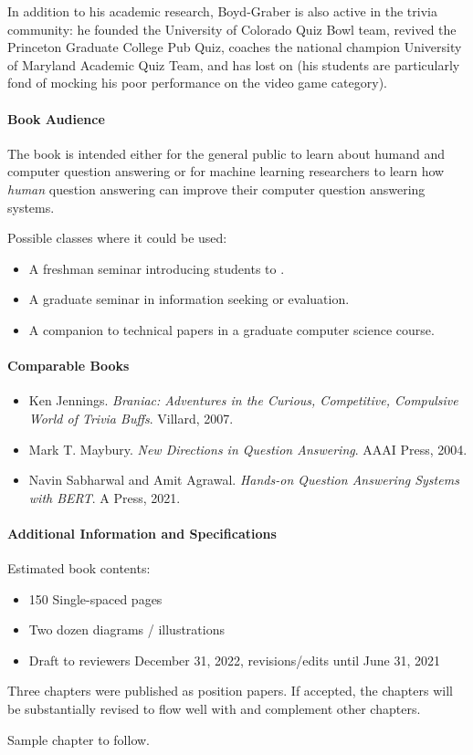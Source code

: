 In addition to his academic research, Boyd-Graber is also active in the trivia
community: he founded the University of Colorado Quiz Bowl team, revived the
Princeton Graduate College Pub Quiz, coaches the national champion University
of Maryland Academic Quiz Team, and has lost on \jeopardyp{} (his
students are particularly fond of mocking his poor performance on the
video game category).

\paragraph{Book Audience}

The book is intended either for the general public to learn about humand and computer
question answering or for machine learning researchers to learn
how \emph{human} question answering can improve their computer question
answering systems.

Possible classes where it could be used:
\begin{itemize}
        \item A freshman seminar introducing students to .
        \item A graduate seminar in information seeking or evaluation.
        \item A companion to technical papers in a graduate computer science course.
\end{itemize}

\paragraph{Comparable Books}

\begin{itemize}
        \item Ken Jennings.  \textit{Braniac: Adventures in the Curious,
        Competitive, Compulsive World of Trivia Buffs}.  Villard, 2007.

        \item Mark T. Maybury.  \textit{New Directions in Question
        Answering}.  AAAI Press, 2004.

        \item Navin Sabharwal and Amit Agrawal.  \textit{Hands-on Question
        Answering Systems with BERT}.  A Press, 2021.
\end{itemize}


\paragraph{Additional Information and Specifications}

Estimated book contents:
\begin{itemize}
  \item 150 Single-spaced pages
  \item Two dozen diagrams / illustrations
  \item Draft to reviewers December 31, 2022, revisions/edits until
    June 31, 2021
\end{itemize}

Three chapters were published as position papers.  If accepted, the
chapters will be substantially revised to flow well with and
complement other chapters.

Sample chapter to follow.
